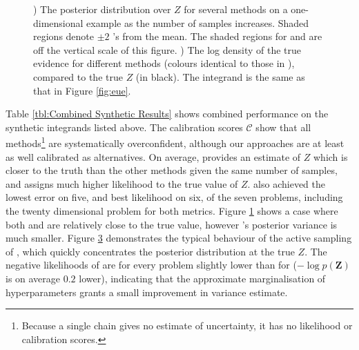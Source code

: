 \documentclass{article} %
\begin{document}
\begin{figure}
	\begin{subfigure}[b]{7.5cm}
		\caption{}
		\label{fig:se}
	\end{subfigure}
	\begin{subfigure}[b]{6cm}
		\caption{}
		\label{fig:nll}
	\end{subfigure}
	\caption{) The posterior distribution over $Z$ for several methods on a one-dimensional example as the number of samples increases.  Shaded regions denote $\pm2$ 's from the mean.  The shaded regions for  and  are off the vertical scale of this figure. ) The log density of the true evidence for different methods (colours identical to those in ), compared to the true $Z$ (in black).  The integrand is the same as that in Figure \ref{fig:eue}.}
\end{figure}

\begin{table}[h!]
\begin{minipage}[b]{0.5\linewidth}\centering

\end{minipage}
\begin{minipage}[b]{0.5\linewidth}\centering

\end{minipage}
%
\end{table}

Table \ref{tbl:Combined Synthetic Results} shows combined performance on the synthetic integrands listed above. The calibration scores $\mathcal{C}$ show that all methods\footnote{Because a single  chain gives no estimate of uncertainty, it has no likelihood or calibration scores.} are systematically overconfident, although our approaches are at least as well calibrated as alternatives. On average,  provides an estimate of $Z$ which is closer to the truth than the other methods given the same number of samples, and assigns much higher likelihood to the true value of $Z$.  also achieved the lowest error on five, and best likelihood on six, of the seven problems, including the twenty dimensional problem for both metrics.  Figure \ref{fig:se} shows a case where both
  and  are relatively close to the true value, however 's posterior variance is much smaller.  Figure \ref{fig:nll} demonstrates the typical behaviour of the active sampling of , which quickly concentrates the posterior distribution at the true $Z$. The negative likelihoods of  are for every problem slightly lower than for  ($-\log p(\mathbf{Z})$ is on average $0.2$ lower), indicating that the approximate marginalisation of hyperparameters grants a small improvement in variance estimate. 
\end{document}
